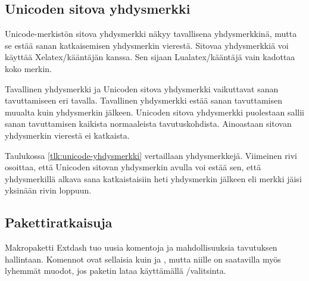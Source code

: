 \subsection{Unicoden sitova yhdysmerkki}
\label{luku:unicode_sitova}

Unicode-merkistön sitova yhdysmerkki  näkyy tavallisena yhdysmerkkinä, mutta se estää sanan
katkaisemisen yhdysmerkin vierestä. Sitovaa yhdysmerkkiä voi käyttää
Xelatex\-/kääntäjän kanssa. Sen sijaan Lualatex\-/kääntäjä vain kadottaa
koko merkin.

Tavallinen yhdysmerkki  ja Unicoden
sitova yhdysmerkki  vaikuttavat sanan tavuttamiseen eri
tavalla. Tavallinen yhdysmerkki estää sanan tavuttamisen muualta kuin
yhdysmerkin jälkeen. Unicoden sitova yhdysmerkki puolestaan sallii sanan
tavuttamisen kaikista normaaleista tavutuskohdista. Ainoastaan sitovan
yhdysmerkin vierestä ei katkaista.


Taulukossa \ref{tlk:unicode-yhdysmerkki} vertaillaan yhdysmerkkejä.
Viimeinen rivi osoittaa, että Unicoden sitovan yhdysmerkin avulla voi
estää sen, että yhdysmerkillä alkava sana katkaistaisiin heti
yhdysmerkin jälkeen eli merkki jäisi yksinään rivin loppuun.

\subsection{Pakettiratkaisuja}

Makropaketti Extdash tuo uusia komentoja ja mahdollisuuksia tavutuksen
hallintaan. Komennot ovat sellaisia kuin  ja
, mutta niille on saatavilla myös lyhemmät muodot,
jos paketin lataa käyttämällä \-/valitsinta.

